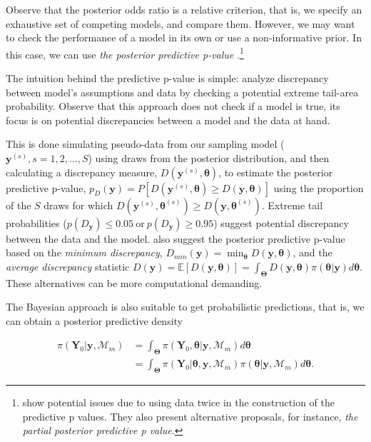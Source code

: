 Observe that the posterior odds ratio is a relative criterion, that is, we specify an exhaustive set of competing models, and compare them. However, we may want to check the performance of a model in its own or use a non-informative prior. In this case, we can use \textit{the posterior predictive p-value} \cite{Gelman1996,gelman1996posterior}.\footnote{\cite{Bayarri2000} show potential issues due to using data twice in the construction of the predictive p values. They also present alternative proposals, for instance, \textit{the partial posterior predictive p value}.}

The intuition behind the predictive p-value is simple: analyze discrepancy between model's assumptions and data by checking a potential extreme tail-area probability. Observe that this approach does not check if a model is true, its focus is on potential discrepancies between a model and the data at hand. 

This is done simulating pseudo-data from our sampling model ($\mathbf{y}^{(s)}, s=1,2,\dots,S$) using draws from the posterior distribution, and then calculating a discrepancy measure, $D(\mathbf{y}^{(s)},\mathbf{\theta})$, to estimate the posterior predictive p-value, $p_D(\mathbf{y})=P[D(\mathbf{y}^{(s)},\mathbf{\theta})\geq D(\mathbf{y},\mathbf{\theta})]$ using the proportion of the $S$ draws for which $D(\mathbf{y}^{(s)},\mathbf{\theta}^{(s)})\geq D(\mathbf{y},\mathbf{\theta}^{(s)})$. Extreme tail probabilities ($p(D_{\mathbf{y}}) \leq 0.05  \ \text{or} \ p(D_{\mathbf{y}}) \geq 0.95$) suggest potential discrepancy between the data and the model. \cite{gelman1996posterior} also suggest the posterior predictive p-value based on the \textit{minimum discrepancy}, $D_{min}(\mathbf{y})=\min_{\mathbf{\theta}}D(\mathbf{y},\mathbf{\theta})$, and the \textit{average discrepancy} statistic $D(\mathbf{y})=\mathbb{E}[D(\mathbf{y},\mathbf{\theta})]=\int_{\mathbf{\Theta}}D(\mathbf{y},\mathbf{\theta})\pi(\mathbf{\theta|\mathbf{y}})d\mathbf{\theta}$. These alternatives can be more computational demanding.

The Bayesian approach is also suitable to get probabilistic predictions, that is, we can obtain a posterior predictive density 

\begin{align}
	\pi(\mathbf{Y}_0|\mathbf{y},\mathcal{M}_m) & =\int_{\mathbf{\Theta}}\pi(\mathbf{Y}_0,\mathbf{\theta}|\mathbf{y},\mathcal{M}_m)d\mathbf{\theta}\nonumber\\
	&=\int_{\mathbf{\Theta}}\pi(\mathbf{Y}_0|\mathbf{\theta},\mathbf{y},\mathcal{M}_m)\pi(\mathbf{\theta}|\mathbf{y},\mathcal{M}_m)d\mathbf{\theta}.
	\label{eq:126}
\end{align}

